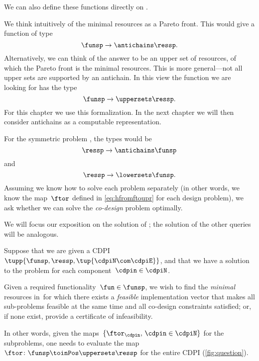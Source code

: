We can also define these functions directly on \DP.

We think intuitively of the minimal resources as a Pareto front.
This would give a function of type
\begin{equation}
	\funsp \to \antichains\ressp.
\end{equation}
Alternatively, we can think of the answer to be an upper set of resources, of which the Pareto front is the minimal resources.
This is more general---not all upper sets are supported by an antichain.
In this view the function we are looking for has the type
\begin{equation}
	\funsp \to \uppersets\ressp.
\end{equation}
For this chapter we use this formalization.
In the next chapter we will then consider antichains as a computable representation.

For the symmetric problem \FixResMaxFun, the types would be
\begin{equation}
	\ressp \to \antichains\funsp
\end{equation}
and
\begin{equation}
	\ressp \to \lowersets\funsp.
\end{equation}
%
Assuming we know how to solve each problem separately (in other words, we know the map~$\ftor$ defined in \cref{eq:hfromftoupr} for each design problem), we ask whether we can solve the \emph{co-design} problem optimally.

We will focus our exposition on the solution of \FixFunMinRes; the solution of the other queries will be analogous.

\begin{problem}
\label{prob:MCDP}
Suppose that we are given a CDPI~$\tupp{ \funsp,\ressp, \tup{ \cdpiN \com \cdpiE} }$, and that we have a solution to the \FixFunMinRes problem for each component~$\cdpin\in\cdpiN$.

Given a required functionality~$\fun\in\funsp$, we wish to find the \emph{minimal} resources in~\ressp for which there exists a \emph{feasible} implementation vector that makes all sub-problems feasible at the same time and all co-design constraints satisfied; or, if none exist, provide a certificate of infeasibility.
\end{problem}
In other words, given the maps~$\{\ftor_{\cdpin},\,\cdpin\in\cdpiN\}$ for the subproblems, one needs to evaluate  the map~$\ftor\colon\funsp \toinPos \uppersets \ressp$ for the entire CDPI (\cref{fig:question}).

